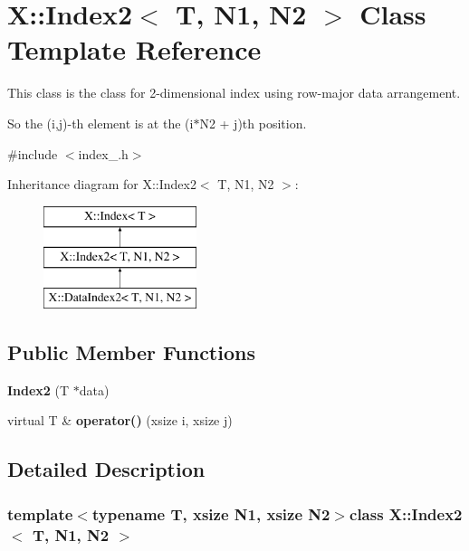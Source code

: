 \hypertarget{class_x_1_1_index2}{\section{X\-:\-:Index2$<$ T, N1, N2 $>$ Class Template Reference}
\label{class_x_1_1_index2}
}


This class is the class for 2-\/dimensional index using row-\/major data arrangement.\par
 So the (i,j)-\/th element is at the (i$\ast$\-N2 + j)th position.  




{\ttfamily \#include $<$index\-\_.\-h$>$}

Inheritance diagram for X\-:\-:Index2$<$ T, N1, N2 $>$\-:\begin{figure}[H]
\begin{center}
\leavevmode
\includegraphics[height=3.000000cm]{class_x_1_1_index2}
\end{center}
\end{figure}
\subsection*{Public Member Functions}
\begin{DoxyCompactItemize}
\item 
\hypertarget{class_x_1_1_index2_a1b791266a385e8e171f4a1d5bc72e747}{{\bfseries Index2} (T $\ast$data)}\label{class_x_1_1_index2_a1b791266a385e8e171f4a1d5bc72e747}

\item 
\hypertarget{class_x_1_1_index2_a06e8ccdbe72125ccff7b5d8db35892e7}{virtual T \& {\bfseries operator()} (xsize i, xsize j)}\label{class_x_1_1_index2_a06e8ccdbe72125ccff7b5d8db35892e7}

\end{DoxyCompactItemize}


\subsection{Detailed Description}
\subsubsection*{template$<$typename T, xsize N1, xsize N2$>$class X\-::\-Index2$<$ T, N1, N2 $>$}

